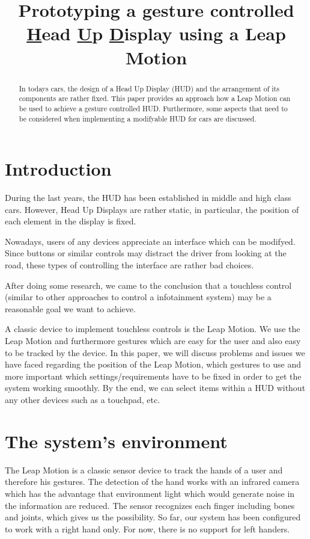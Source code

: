 \documentclass{sigchi-ext}
\title{Prototyping a gesture controlled \underline{H}ead \underline{U}p \underline{D}isplay using a Leap Motion}
\author{%
  \alignauthor{%
    \textbf{Daniel Brand}\\
    \affaddr{University of Salzburg} \\
    \affaddr{Salzburg, 5020, AUT} \\
    \email{Daniel.Brand@stud.sbg.ac.at} 
}
\alignauthor{%
    \textbf{Kevin B\"uchele}\\
    \affaddr{University of Salzburg}\\
    \affaddr{Salzburg, 5020, AUT}\\
    \email{Kevin.Buechele@stud.sbg.ac.at} 
} \vfil 
}
\begin{document}
\maketitle

\RaggedRight{} 

\begin{abstract}
In todays cars, the design of a Head Up Display (HUD) and
the arrangement of its components are rather fixed. This paper provides an approach
how a Leap Motion can be used to achieve a gesture controlled HUD. Furthermore, some aspects that need to be considered
when implementing a modifyable HUD for cars are discussed.
\end{abstract}


\section{Introduction}
During the last years, the HUD has been established in middle and high class cars.
However, Head Up Displays are rather static, in particular, the position of each element in the display
is fixed.

Nowadays, users of any devices appreciate an interface which can be modifyed.
Since buttons or similar controls may distract the driver from looking at the road,
these types of controlling the interface are rather bad choices.

After doing some research, we came to the conclusion that a touchless control
(similar to other approaches to control a infotainment system)
may be a reasonable goal we want to achieve.

A classic device to implement touchless controls is the Leap Motion. We use the Leap Motion
and furthermore gestures which are easy for the user and also easy to be tracked by the device.
In this paper, we will discuss problems and issues we have faced regarding the position of
the Leap Motion, which gestures to use and more important which settings/requirements have to be fixed
in order to get the system working smoothly. By the end, we can select items within a HUD
without any other devices such as a touchpad, etc.

\section{The system's environment}
The Leap Motion is a classic sensor device to track the hands of a user and therefore his gestures.
The detection of the hand works with an infrared camera which has the advantage that environment light
which would generate noise in the information are reduced. The sensor recognizes each finger including
bones and joints, which gives us the possibility. So far, our system has been configured to work with a right hand only.
For now, there is no support for left handers.
\end{document}
